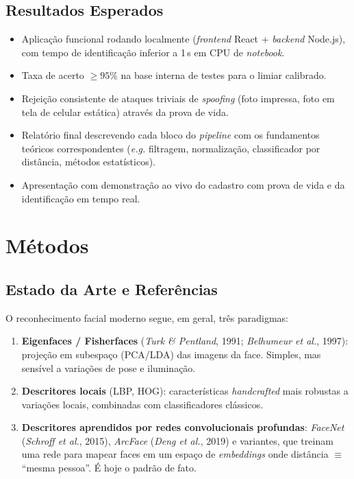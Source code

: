 \documentclass[12pt,a4paper]{article}
\begin{document}
\subsection*{Resultados Esperados}

\begin{itemize}[leftmargin=*]
    \item Aplica\c{c}\~ao funcional rodando localmente (\emph{frontend} React + \emph{backend}
    Node.js), com tempo de identifica\c{c}\~ao inferior a 1\,s em CPU de \emph{notebook}.
    \item Taxa de acerto $\geq 95\%$ na base interna de testes para o limiar calibrado.
    \item Rejei\c{c}\~ao consistente de ataques triviais de \emph{spoofing} (foto impressa,
    foto em tela de celular est\'atica) atrav\'es da prova de vida.
    \item Relat\'orio final descrevendo cada bloco do \emph{pipeline} com os fundamentos
    te\'oricos correspondentes (\emph{e.g.} filtragem, normaliza\c{c}\~ao, classificador por
    dist\^ancia, m\'etodos estat\'isticos).
    \item Apresenta\c{c}\~ao com demonstra\c{c}\~ao ao vivo do cadastro com prova de vida
    e da identifica\c{c}\~ao em tempo real.
\end{itemize}

\section{M\'etodos}

\subsection{Estado da Arte e Refer\^encias}

O reconhecimento facial moderno segue, em geral, tr\^es paradigmas:

\begin{enumerate}[leftmargin=*]
    \item \textbf{Eigenfaces / Fisherfaces} (\emph{Turk \& Pentland}, 1991; \emph{Belhumeur et al.},
    1997): proje\c{c}\~ao em subespa\c{c}o (PCA/LDA) das imagens da face. Simples, mas
    sens\'ivel a varia\c{c}\~oes de pose e ilumina\c{c}\~ao.

    \item \textbf{Descritores locais} (LBP, HOG): caracter\'isticas \emph{handcrafted} mais
    robustas a varia\c{c}\~oes locais, combinadas com classificadores cl\'assicos.

    \item \textbf{Descritores aprendidos por redes convolucionais profundas}:
    \emph{FaceNet} (\emph{Schroff et al.}, 2015), \emph{ArcFace} (\emph{Deng et al.}, 2019)
    e variantes, que treinam uma rede para mapear faces em um espa\c{c}o de
    \emph{embeddings} onde dist\^ancia $\equiv$ ``mesma pessoa''. \'E hoje o
    padr\~ao de fato.
\end{enumerate}
\end{document}
